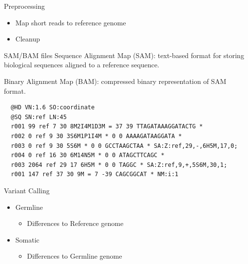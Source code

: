\documentclass[usepdftitle=false]{beamer}
\begin{document}
\begin{frame}{Preprocessing}
	\begin{itemize}
		\item Map short reads to reference genome
		\pause
		\item Cleanup
	\end{itemize}
\end{frame}

\begin{frame}[fragile]{SAM/BAM files}
	Sequence Alignment Map (SAM): text-based format for storing biological sequences aligned to a reference sequence.
	\pause

	Binary Alignment Map (BAM): compressed binary representation of SAM format.
	\pause

	\begin{verbatim}
  @HD VN:1.6 SO:coordinate
  @SQ SN:ref LN:45
  r001 99 ref 7 30 8M2I4M1D3M = 37 39 TTAGATAAAGGATACTG *
  r002 0 ref 9 30 3S6M1P1I4M * 0 0 AAAAGATAAGGATA *
  r003 0 ref 9 30 5S6M * 0 0 GCCTAAGCTAA * SA:Z:ref,29,-,6H5M,17,0;
  r004 0 ref 16 30 6M14N5M * 0 0 ATAGCTTCAGC *
  r003 2064 ref 29 17 6H5M * 0 0 TAGGC * SA:Z:ref,9,+,5S6M,30,1;
  r001 147 ref 37 30 9M = 7 -39 CAGCGGCAT * NM:i:1
	\end{verbatim}
\end{frame}

\begin{frame}{Variant Calling}
	\begin{itemize}
		\item Germline
		\pause
		\begin{itemize}
			\item Differences to Reference genome
		\end{itemize}
		\pause
		\item Somatic
		\pause
		\begin{itemize}
			\item Differences to Germline genome
		\end{itemize}
	\end{itemize}
\end{frame}
\end{document}
